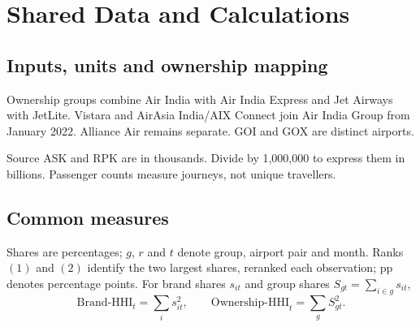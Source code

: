\section{Shared Data and Calculations}
\label{app:shared-calculations}
\label{app:o4-dictionary}
\label{app:variable-dictionary}
\label{app:team-variables}
\subsection{Inputs, units and ownership mapping}
\label{app:o4-input-definitions}
Ownership groups combine Air India with Air India Express and Jet Airways with JetLite. Vistara and AirAsia India/AIX Connect join Air India Group from January 2022. Alliance Air remains separate. GOI and GOX are distinct airports.

Source ASK and RPK are in thousands. Divide by 1,000,000 to express them in billions. Passenger counts measure journeys, not unique travellers.

\subsection{Common measures}
\label{app:o4-measure-definitions}
Shares are percentages; $g$, $r$ and $t$ denote group, airport pair and month. Ranks $(1)$ and $(2)$ identify the two largest shares, reranked each observation; pp denotes percentage points. For brand shares $s_{it}$ and group shares $S_{gt}=\sum_{i\in g}s_{it}$,
\begin{equation}
\mathrm{Brand\mbox{-}HHI}_t=\sum_i s_{it}^2,\qquad
\mathrm{Ownership\mbox{-}HHI}_t=\sum_g S_{gt}^2.
\tag{A.1}\label{eq:review-o1-indices}
\end{equation}

